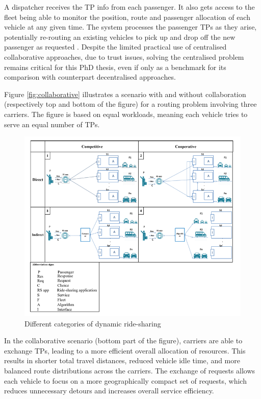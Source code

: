 A dispatcher receives the TP info from each passenger. It also gets access to the fleet being able to monitor the position, route and passenger allocation of each vehicle at any given time. The system processes the passenger TPs as they arise, potentially re-routing an existing vehicles to pick up and drop off the new passenger as requested \cite{masoud2017decentralized}. Despite the limited practical use of centralised collaborative approaches, due to trust issues, solving the centralised problem remains critical for this PhD thesis, even if only as a benchmark for its comparison with counterpart decentralised approaches. 

Figure \ref{fig:collaborative} illustrates a scenario with and without collaboration (respectively top and bottom of the figure) for a routing problem involving three carriers. The figure is based on equal workloads, meaning each vehicle tries to serve an equal number of TPs. 

\begin{figure}[htbp]
    \centering
    \includegraphics[scale=0.6]{Crest/Images/dynamic_rideshare_category.png}
    \caption{Different categories of dynamic ride-sharing \cite{soa_rideshare}}
    \label{fig:rideshare_category}
\end{figure}

In the collaborative scenario (bottom part of the figure), carriers are able to exchange TPs, leading to a more efficient overall allocation of resources. This results in shorter total travel distances, reduced vehicle idle time, and more balanced route distributions across the carriers. The exchange of requests allows each vehicle to focus on a more geographically compact set of requests, which reduces unnecessary detours and increases overall service efficiency. 

